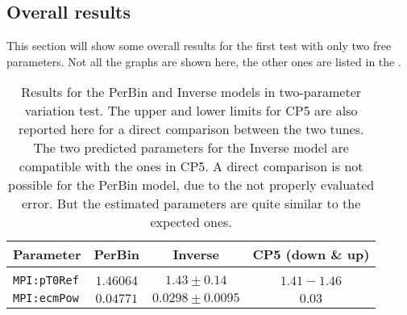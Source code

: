 \subsection{Overall results}
\label{subsec:Overall2PARAMS}

This section will show some overall results for the first test with only two free parameters. Not all the graphs are shown here, the other ones are listed in the  .

\begin{table}[!htb]
\centering
	\begin{tabular}{l | c | c | c}
		Parameter & PerBin & Inverse & CP5 (down \& up)\\ \hline\hline
		\\[-0.85em]		
		\texttt{MPI:pT0Ref} & $ 1.46064$ & $ 1.43 \pm 0.14 $ & $1.41 - 1.46$ \\[2pt]
		\texttt{MPI:ecmPow} & $ 0.04771$ & $ 0.0298 \pm 0.0095 $ & $0.03$\\[2pt]
	\end{tabular}
	\caption{Results for the PerBin and Inverse models in two-parameter variation test. The upper and lower limits for CP5 are also reported here for a direct comparison between the two tunes.
The two predicted parameters for the Inverse model are compatible with the ones in CP5. A direct comparison is not possible for the PerBin model, due to the not properly evaluated error. But the  estimated parameters are quite similar to the expected ones.}
	\label{table:ResultInverse_2params}
\end{table}


